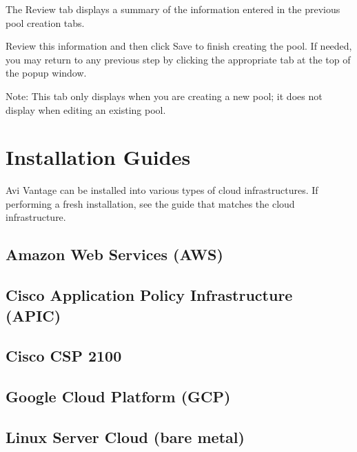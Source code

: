 \documentclass[letterpaper,10pt,english]{sphinxmanual}
\begin{document}
The Review tab displays a summary of the information entered in the previous pool creation tabs.

Review this information and then click Save to finish creating the pool. If needed, you may return to any previous step by clicking the appropriate tab at the top of the popup window.

Note: This tab only displays when you are creating a new pool; it does not display when editing an existing pool.


\chapter{Installation Guides}
\label{\detokenize{installation/index::doc}}\label{\detokenize{installation/index:installation-guides}}
Avi Vantage can be installed into various types of cloud infrastructures. If performing a fresh installation, see the guide that matches the cloud infrastructure.


\section{Amazon Web Services (AWS)}
\label{\detokenize{installation/aws:amazon-web-services-aws}}\label{\detokenize{installation/aws::doc}}

\section{Cisco Application Policy Infrastructure (APIC)}
\label{\detokenize{installation/cisco_apic:cisco-application-policy-infrastructure-apic}}\label{\detokenize{installation/cisco_apic::doc}}

\section{Cisco CSP 2100}
\label{\detokenize{installation/csp_2100:cisco-csp-2100}}\label{\detokenize{installation/csp_2100::doc}}

\section{Google Cloud Platform (GCP)}
\label{\detokenize{installation/gcp::doc}}\label{\detokenize{installation/gcp:google-cloud-platform-gcp}}

\section{Linux Server Cloud (bare metal)}
\label{\detokenize{installation/linux_server_cloud:linux-server-cloud-bare-metal}}\label{\detokenize{installation/linux_server_cloud::doc}}
\end{document}
